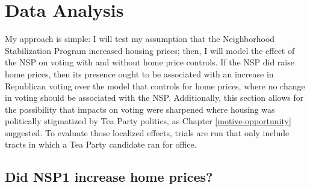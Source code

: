 \documentclass[12pt,oneside]{psthesis}
\begin{document}
\hypertarget{analysis}{%
\section{Data Analysis}\label{analysis}}

My approach is simple: I will test my assumption that the Neighborhood Stabilization Program increased housing prices; then, I will model the effect of the NSP on voting with and without home price controls.
If the NSP did raise home prices, then its presence ought to be associated with an increase in Republican voting over the model that controls for home prices, where no change in voting should be associated with the NSP.
Additionally, this section allows for the possibility that impacts on voting were sharpened where housing was politically stigmatized by Tea Party politics, as Chapter \ref{motive-opportunity} suggested.
To evaluate those localized effects, trials are run that only include tracts in which a Tea Party candidate ran for office.

\hypertarget{did-nsp1-increase-home-prices}{%
\subsection{Did NSP1 increase home prices?}\label{did-nsp1-increase-home-prices}}
\end{document}
